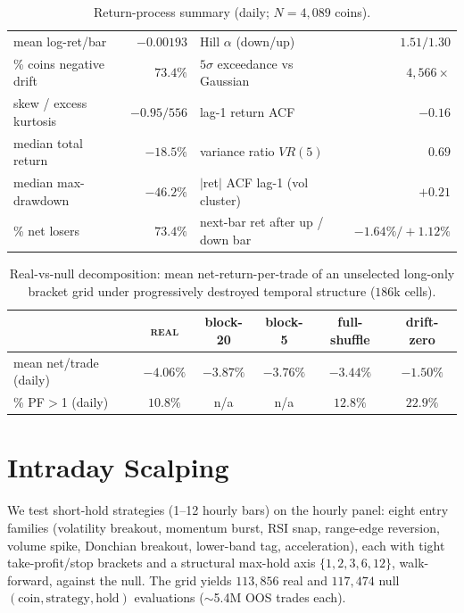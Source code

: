 \documentclass[12pt]{article}
\newcommand{\real}{\textsc{real}}
\begin{document}
\begin{table}[tbp]\centering\small
\caption{Return-process summary (daily; $N\!=\!4{,}089$ coins).}\label{tab:stat}
\begin{tabular}{lr@{\hskip 1.6em}lr}\toprule
mean log-ret/bar & $-0.00193$ & Hill $\alpha$ (down/up) & $1.51/1.30$\\
\% coins negative drift & $73.4\%$ & $5\sigma$ exceedance vs Gaussian & $4{,}566\times$\\
skew / excess kurtosis & $-0.95/556$ & lag-1 return ACF & $-0.16$\\
median total return & $-18.5\%$ & variance ratio $VR(5)$ & $0.69$\\
median max-drawdown & $-46.2\%$ & $|$ret$|$ ACF lag-1 (vol cluster) & $+0.21$\\
\% net losers & $73.4\%$ & next-bar ret after up / down bar & $-1.64\%/+1.12\%$\\\bottomrule
\end{tabular}
\end{table}
\begin{table}[tbp]\centering\small
\caption{Real-vs-null decomposition: mean net-return-per-trade of an unselected long-only bracket grid under progressively destroyed temporal structure ($186$k cells).}\label{tab:decomp}
\begin{tabular}{lccccc}\toprule
& \real & block-20 & block-5 & full-shuffle & drift-zero\\\midrule
mean net/trade (daily) & $-4.06\%$ & $-3.87\%$ & $-3.76\%$ & $-3.44\%$ & $-1.50\%$\\
\% PF$>$1 (daily) & $10.8\%$ & n/a & n/a & $12.8\%$ & $22.9\%$\\\bottomrule
\end{tabular}
\end{table}

\section{Intraday Scalping}\label{sec:scalp}
We test short-hold strategies (1--12 hourly bars) on the hourly panel: eight entry families (volatility breakout, momentum burst, RSI snap, range-edge reversion, volume spike, Donchian breakout, lower-band tag, acceleration), each with tight take-profit/stop brackets and a structural max-hold axis $\{1,2,3,6,12\}$, walk-forward, against the null. The grid yields $113{,}856$ real and $117{,}474$ null $(\text{coin},\text{strategy},\text{hold})$ evaluations ($\sim$5.4M OOS trades each).
\end{document}
